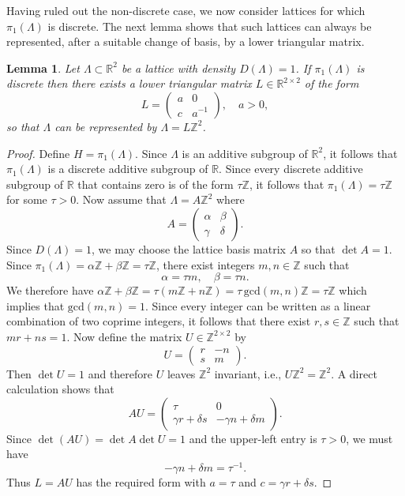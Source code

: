 \documentclass[reqno,a4paper,12pt]{amsart}
\numberwithin{equation}{section}
\newtheorem{lemma}[definition]{Lemma}
\def\Z{{\mathbb Z}}
\def\R{{\mathbb R}}
\newcommand\1{\mathds{1}}
\begin{document}
Having ruled out the non-discrete case, we now consider lattices for which $\pi_1(\Lambda)$ is discrete. The next lemma shows that such lattices can always be represented, after a suitable change of basis, by a lower triangular matrix.

\begin{lemma}\label{lma:discrete_impl_lower_triangular}
    Let $\Lambda \subset \R^2$ be a lattice with density $D(\Lambda) = 1$. If $\pi_1(\Lambda)$ is discrete then there exists a lower triangular matrix $L \in \R^{2 \times 2}$ of the form
    $$
    L=\begin{pmatrix} a&0\\ c&a^{-1}\end{pmatrix},
\quad a>0,
    $$
    so that $\Lambda$ can be represented by $\Lambda = L\Z^2$.
\end{lemma}
\begin{proof}
    Define $H = \pi_1(\Lambda)$. Since $\Lambda$ is an additive subgroup of $\R^2$, it follows that $\pi_1(\Lambda)$ is a discrete additive subgroup of $\R$. Since every discrete additive subgroup of $\R$ that contains zero is of the form $\tau \Z$, it follows that $\pi_1(\Lambda) = \tau \Z$ for some $\tau > 0$.
    Now assume that $\Lambda = A \Z^2$ where
    $$
    A = \begin{pmatrix}
        \alpha & \beta \\ \gamma & \delta
    \end{pmatrix}.
    $$
    Since $D(\Lambda)=1$, we may choose the lattice basis matrix $A$ so that $\det A=1$.
    Since $\pi_1(\Lambda) = \alpha\Z + \beta\Z = \tau \Z$, there exist integers $m,n \in \Z$ such that
    $$
    \alpha = \tau m, \quad \beta = \tau n.
    $$
    We therefore have
    $
    \alpha\Z + \beta\Z = \tau ( m\Z + n \Z ) = \tau \,  \mathrm{gcd}(m,n) \Z = \tau \Z
    $
    which implies that $\mathrm{gcd}(m,n)=1$. Since every integer can be written as a linear combination of two coprime integers, it follows that there exist $r,s \in \Z$ such that
    $
    mr+ns = 1.
    $
    Now define the matrix $U \in \Z^{2 \times 2}$ by
    $$
    U = \begin{pmatrix}
        r & -n \\ s & m
    \end{pmatrix}.
    $$
    Then $\det U = 1$ and therefore $U$ leaves $\Z^2$ invariant, i.e., $U\Z^2 = \Z^2$. A direct calculation shows that
    $$
    AU =\begin{pmatrix}
        \tau & 0 \\ \gamma r + \delta s & -\gamma n + \delta m
    \end{pmatrix}.
    $$
    Since $\det(AU)=\det A\det U=1$ and the upper-left entry is $\tau>0$,
we must have
\[
-\gamma n+\delta m=\tau^{-1}.
\]
Thus $L =AU$ has the required form with $a=\tau$ and
$c=\gamma r+\delta s$.
\end{proof}
\end{document}
